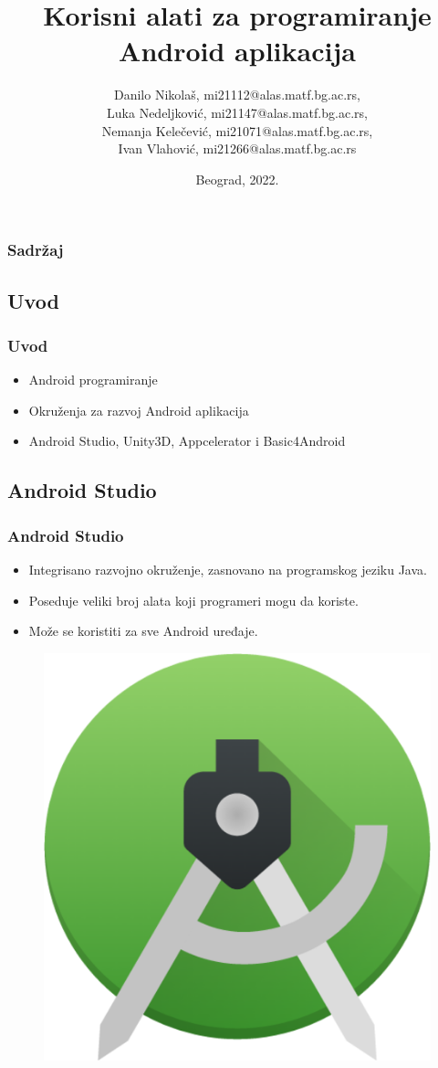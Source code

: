 \documentclass{beamer}
\title{Korisni alati za programiranje Android aplikacija}
\author{   Danilo Nikolaš, mi21112@alas.matf.bg.ac.rs,
	\\ Luka Nedeljković, mi21147@alas.matf.bg.ac.rs,
	\\ Nemanja Kelečević, mi21071@alas.matf.bg.ac.rs,
	\\ Ivan Vlahović, mi21266@alas.matf.bg.ac.rs}
\institute[]{Matematički fakultet, Univerzitet u Beogradu}
\date{
	\footnotesize{Beograd, 2022.}	
}
\begin{document}
\begin{frame}
	\titlepage
\end{frame}


\begin{frame}
	\frametitle{Sadržaj}
	\tableofcontents[hidesubsections] 
\end{frame}

\begin{frame}
    \section{Uvod}
    \frametitle{Uvod} 
    \begin{itemize}
	\item Android programiranje
	\item Okruženja za razvoj Android aplikacija
	\item Android Studio, Unity3D, Appcelerator i Basic4Android
   \end{itemize}
\end{frame}

\begin{frame}
    \section{Android Studio}
    \frametitle{Android Studio} 
    \begin{itemize}
	\item Integrisano razvojno okruženje, zasnovano na programskog jeziku Java.
	\item Poseduje veliki broj alata koji programeri mogu da koriste.
	\item  Može se koristiti za sve Android uređaje.
   \end{itemize}
   \begin{figure}[ht!]
    \centering
    \includegraphics[scale=0.10]{android_studio_logo.png}
\end{figure}
\end{frame}
\end{document}
